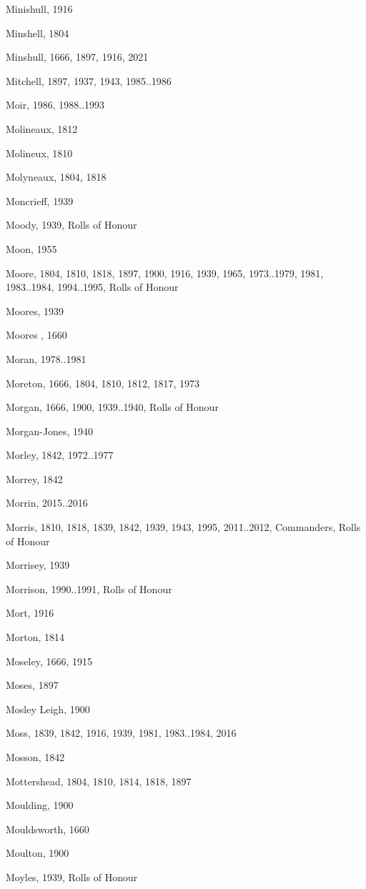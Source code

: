 \begin{theindex}
\item Minishull, 1916
\item Minshell, 1804
\item Minshull, 1666, 1897, 1916, 2021
\item Mitchell, 1897, 1937, 1943, 1985..1986
\item Moir, 1986, 1988..1993
\item Molineaux, 1812
\item Molineux, 1810
\item Molyneaux, 1804, 1818
\item Moncrieff, 1939
\item Moody, 1939, Rolls of Honour
\item Moon, 1955
\item Moore, 1804, 1810, 1818, 1897, 1900, 1916, 1939, 1965, 1973..1979, 1981, 1983..1984, 1994..1995, Rolls of Honour
\item Moores, 1939
\item Moores , 1660
\item Moran, 1978..1981
\item Moreton, 1666, 1804, 1810, 1812, 1817, 1973
\item Morgan, 1666, 1900, 1939..1940, Rolls of Honour
\item Morgan-Jones, 1940
\item Morley, 1842, 1972..1977
\item Morrey, 1842
\item Morrin, 2015..2016
\item Morris, 1810, 1818, 1839, 1842, 1939, 1943, 1995, 2011..2012, Commanders, Rolls of Honour
\item Morrisey, 1939
\item Morrison, 1990..1991, Rolls of Honour
\item Mort, 1916
\item Morton, 1814
\item Moseley, 1666, 1915
\item Moses, 1897
\item Mosley Leigh, 1900
\item Moss, 1839, 1842, 1916, 1939, 1981, 1983..1984, 2016
\item Mosson, 1842
\item Mottershead, 1804, 1810, 1814, 1818, 1897
\item Moulding, 1900
\item Mouldsworth, 1660
\item Moulton, 1900
\item Moyles, 1939, Rolls of Honour

\end{theindex}
